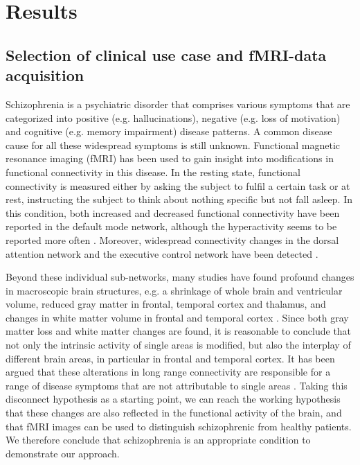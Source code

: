\documentclass[%
]{frontiersSCNS-nologo} %
\renewcommand*{\|}{\mathpunct{|}}%
\begin{document}
\section{Results}
\label{sec:results}

\subsection{Selection of clinical use case and fMRI-data acquisition}
\label{sec:data_acquisition}

Schizophrenia is a psychiatric disorder that comprises various symptoms
that are categorized into positive (e.g. hallucinations), negative (e.g.
loss of motivation) and cognitive (e.g. memory impairment) disease
patterns. A common disease cause for all these widespread symptoms is still
unknown. Functional magnetic resonance imaging (fMRI) has been used to gain
insight into modifications in functional connectivity in this disease. In the resting state, functional connectivity is measured either
by asking the subject to fulfil a certain task or at rest, instructing the
subject to think about nothing specific but not fall asleep. In this
condition, both increased and decreased
functional connectivity have been reported in the default mode network,
although the hyperactivity seems to be reported more often \citep{Hu2017}.
Moreover, widespread connectivity changes in the dorsal attention network
and the executive control network have been detected \citep{Woodward2011,Yu2012}.

Beyond these individual sub-networks, many studies have found profound
changes in macroscopic brain structures, e.g. a shrinkage of whole brain
and ventricular volume, reduced gray matter in frontal, temporal cortex and
thalamus, and changes in white matter volume in frontal and temporal cortex
\citep{Shenton2010,Wright2009,Wright2010}. Since both gray matter loss and
white matter changes are found, it is reasonable to conclude that not only
the intrinsic activity of single areas is modified, but also the interplay
of different brain areas, in particular in frontal and temporal cortex. It
has been argued that these alterations in long range connectivity are
responsible for a range of disease symptoms that are not attributable to
single areas \citep{Friston1995}. Taking this disconnect hypothesis as a
starting point, we can reach the working hypothesis that these changes are
also reflected in the functional activity of the brain, and that fMRI
images can be used to distinguish schizophrenic from healthy patients. We
therefore conclude that schizophrenia is an appropriate condition to
demonstrate our approach.
\end{document}
